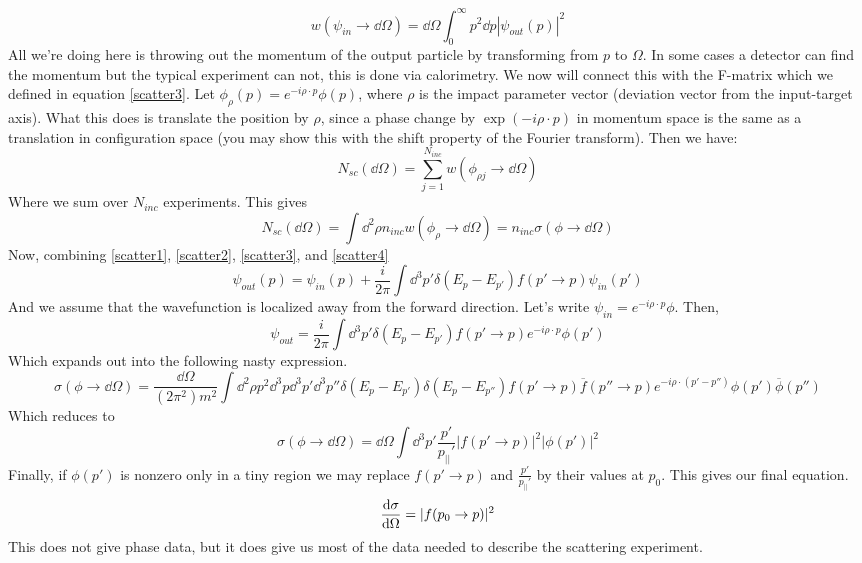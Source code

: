 \documentclass{article}
\begin{document}
\begin{equation}\label{scatter4}w(\psi_{in} \to \dd \Omega) = \dd \Omega \int_0^\infty p^2 \dd p |\psi_{out}(p)|^2\end{equation}
All we're doing here is throwing out the momentum of the output particle by transforming from $p$ to $\Omega$. In some cases a detector can find the momentum but the typical experiment can not, this is done via calorimetry. We now will connect this with the F-matrix which we defined in equation \eqref{scatter3}. Let $\phi_\rho(p) = e^{-i\rho\cdot p} \phi(p)$, where $\rho$ is the impact parameter vector (deviation vector from the input-target axis). What this does is translate the position by $\rho$, since a phase change by $\exp(-i\rho\cdot p)$ in momentum space is the same as a translation in configuration space (you may show this with the shift property of the Fourier transform). Then we have:
\[N_{sc}(\dd \Omega) = \sum_{j=1}^{N_{inc}} w(\phi_{\rho j} \to \dd \Omega)\]
Where we sum over $N_{inc}$ experiments. This gives
\[N_{sc}(\dd \Omega) = \int \dd^2 \rho n_{inc} w(\phi_{\rho} \to \dd \Omega)= n_{inc} \sigma(\phi \to \dd\Omega)\]
Now, combining \eqref{scatter1}, \eqref{scatter2}, \eqref{scatter3}, and \eqref{scatter4}
\begin{equation}\psi_{out}(p) = \psi_{in}(p) + \frac{i}{2\pi} \int \dd^3 p' \delta(E_{p}-E_{p'})f(p' \to p) \psi_{in}(p')\end{equation}
And we assume that the wavefunction is localized away from the forward direction. Let's write $\psi_{in} = e^{-i\rho\cdot p} \phi$. Then,
\[\psi_{out} = \frac{i}{2\pi} \int \dd^3 p' \delta(E_p-E_{p'})f(p' \to p) e^{-i\rho \cdot p} \phi(p')\]
Which expands out into the following nasty expression.
\[\sigma(\phi \to \dd \Omega) = \frac{\dd \Omega}{(2\pi^2)m^2}\int \dd^2 \rho p^2 \dd^3 p  \dd^3 p' \dd^3 p'' \delta(E_p-E_{p'})\delta(E_p-E_{p''})f(p' \to p) \overline{f}(p''\to p) e^{-i \rho \cdot (p'-p'')} \phi(p')\overline{\phi}(p'')\]
Which reduces to
\begin{equation}\sigma(\phi \to \dd\Omega) = \dd \Omega \int \dd^3 p' \frac{p'}{p_{||}'}|f(p'\to p)|^2 |\phi(p')|^2\end{equation}
Finally, if $\phi(p')$ is nonzero only in a tiny region we may replace $f(p'\to p)$ and $\frac{p'}{p_{||}'}$ by their values at $p_0$. This gives our final equation.
\begin{equation}\dv{\sigma}{\Omega}(p_0\to p) = |f(p_0\to p)|^2\end{equation}
This does not give phase data, but it does give us most of the data needed to describe the scattering experiment.
\end{document}
